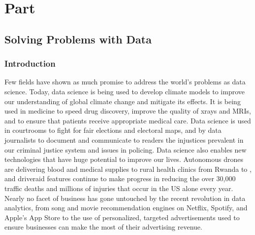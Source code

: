 \documentclass[letterpaper,10pt,english]{jupyterBook}
\begin{document}
\sphinxstepscope


\part{Part}

\sphinxstepscope


\chapter{Solving Problems with Data}
\label{\detokenize{10_introduction/10_our_approach:solving-problems-with-data}}\label{\detokenize{10_introduction/10_our_approach::doc}}

\section{Introduction}
\label{\detokenize{10_introduction/10_our_approach:introduction}}
\sphinxAtStartPar
Few fields have shown as much promise to address the world’s problems as data science. Today, data science is being used to develop climate models to improve our understanding of global climate change and mitigate its effects. It is being used in medicine to speed drug discovery, improve the quality of x\sphinxhyphen{}rays and MRIs, and to ensure that patients receive appropriate medical care. Data science is used in courtrooms to fight for fair elections and electoral maps, and by data journalists to document and communicate to readers the injustices prevalent in our criminal justice system and issues in policing. Data science also enables new technologies that have huge potential to improve our lives. Autonomous drones are delivering blood and medical supplies to rural health clinics from Rwanda to , and driver\sphinxhyphen{}aid features continue to make progress in reducing the over 30,000 traffic deaths and millions of injuries that occur in the US alone every year. Nearly no facet of business has gone untouched by the recent revolution in data analytics, from song and movie recommendation engines on Netflix, Spotify, and Apple’s App Store to the use of personalized, targeted advertisements used to ensure businesses can make the most of their advertising revenue.
\end{document}
